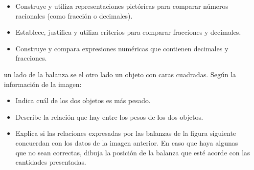 
\evidencias

\begin{itemize}
  \item Construye y utiliza representaciones pictóricas para comparar números racionales (como fracción o decimales).
  \item Establece, justifica y utiliza criterios para comparar fracciones y decimales.
  \item Construye y compara expresiones numéricas que contienen decimales y fracciones.
\end{itemize}

\ejemplo


un lado de la balanza se el otro lado un objeto con caras cuadradas. Según la información de la imagen:

\begin{itemize}
  \item Indica cuál de los dos objetos es más pesado.
  \item Describe la relación que hay entre los pesos de los dos objetos.
  \item Explica si las relaciones expresadas por las balanzas de la figura siguiente concuerdan con los datos de la imagen anterior. En caso que haya algunas que no sean correctas, dibuja la posición de la balanza que esté acorde con las cantidades presentadas.
\end{itemize}




\evidencias


